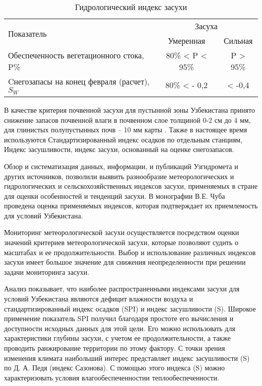 \begin{table}[!tb]
	\centering
	\caption{Гидрологический индекс засухи}\label{tb_atm_drouth}
	\begin{DoubleSpace}
		\begin{tabular}{| l | c | c |}
			\hline
			\hline
			\multirow{2}{*}{Показатель} & \multicolumn{2}{c|}{Засуха} \\ 
			\cmidrule(l){2-3}
			& Умеренная & Сильная \\
			
			\hline
			
			Обеспеченность вегетационного стока, P\% & 80\% < P < 95\% & P > 95\% \\ 

			\hline

			Cнегозапасы на конец февраля (расчет), $S_W$ & 80\% < - 0,2 & < -0,4 \\ 
			
			\hline
			\hline
		\end{tabular}
	\end{DoubleSpace}
\end{table}

В качестве критерия почвенной засухи для пустынной зоны Узбекистана принято снижение запасов почвенной влаги в почвенном слое толщиной 0-2 см до 4 мм, для глинистых полупустынных почв – 10 мм карты \cite{Chub2007}.
Также в настоящее время используются Стандартизированный индекс осадков по отдельным станциям, Индекс засушливости, индекс засухи, основанный на оценке снегозапасов.

Обзор и систематизация данных, информации, и публикаций Узгидромета и других источников, позволили выявить разнообразие метеорологических и гидрологических и сельскохозяйственных индексов засухи, применяемых в стране для оценки особенностей и тенденций засухи. В монографии В.Е. Чуба \cite{Chub2007} проведена оценка применяемых индексов, которая подтверждает их приемлемость для условий Узбекистана.

Мониторинг метеорологической засухи осуществляется посредством оценки значений критериев метеорологической засухи, которые позволяют судить о масштабах и ее продолжительности.
Выбор и использование различных индексов засухи имеет большое значение для снижения неопределенности при решении задачи мониторинга засухи. 

Анализ показывает, что наиболее распространенными индексами засухи для условий Узбекистана являются дефицит влажности воздуха и стандартизированный индекс осадков (SPI) и индекс засушливости (S). Широкое применение показатель SPI получил благодаря простоте его вычисления и доступности исходных данных для этой цели. Его можно использовать для характеристики глубины засухи, с учетом ее продолжительности, а также проводить ранжирование территории по этому фактору. С точки зрения изменения климата наибольший интерес представляет индекс засушливости (S) по Д. А. Педя (индекс Сазонова). С помощью этого индекса (S) можно характеризовать условия влагообеспеченностии теплообеспеченности. 

